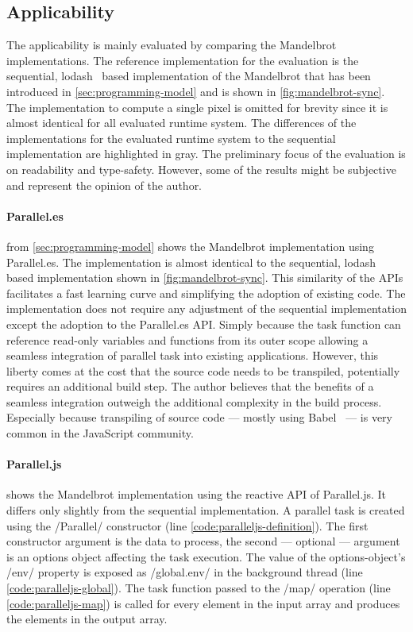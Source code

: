 \subsection{Applicability}
The applicability is mainly evaluated by comparing the Mandelbrot implementations. The reference implementation for the evaluation is the sequential, lodash~\cite{lodash} based implementation of the Mandelbrot that has been introduced in \cref{sec:programming-model} and is shown in \cref{fig:mandelbrot-sync}. The implementation to compute a single pixel is omitted for brevity since it is almost identical for all evaluated runtime system. The differences of the implementations for the evaluated runtime system to the sequential implementation are highlighted in gray. The preliminary focus of the evaluation is on readability and type-safety. However, some of the results might be subjective and represent the opinion of the author. 

\paragraph{Parallel.es}
 from \cref{sec:programming-model} shows the Mandelbrot implementation using Parallel.es. The implementation is almost identical to the sequential, lodash~\cite{lodash} based implementation shown in \cref{fig:mandelbrot-sync}. This similarity of the APIs facilitates a fast learning curve and simplifying the adoption of existing code. The implementation does not require any adjustment of the sequential implementation except the adoption to the Parallel.es API. Simply because the task function can reference read-only variables and functions from its outer scope allowing a seamless integration of parallel task into existing applications. However, this liberty comes at the cost that the source code needs to be transpiled, potentially requires an additional build step. The author believes that the benefits of a seamless integration outweigh the additional complexity in the build process. Especially because transpiling of source code --- mostly using Babel~\cite{babel} --- is very common in the JavaScript community. 

\paragraph{Parallel.js}
 shows the Mandelbrot implementation using the reactive API of Parallel.js. It differs only slightly from the sequential implementation. A parallel task is created using the \javascriptinline/Parallel/ constructor (line \ref{code:paralleljs-definition}). The first constructor argument is the data to process, the second --- optional --- argument is an options object affecting the task execution. The value of the options-object's \javascriptinline/env/ property is exposed as \javascriptinline/global.env/ in the background thread (line \ref{code:paralleljs-global}). The task function passed to the \javascriptinline/map/ operation (line \ref{code:paralleljs-map}) is called for every element in the input array and produces the elements in the output array.

